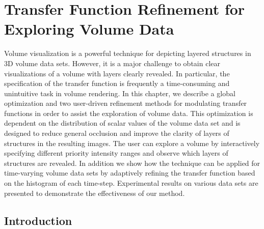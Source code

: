 \chapter{Transfer Function Refinement for Exploring Volume Data}
Volume visualization is a powerful technique for depicting layered structures in 3D volume data sets. However, it is a major challenge to obtain clear visualizations of a volume with layers clearly revealed.
In particular, the specification of the transfer function is frequently a time-consuming and unintuitive task in volume rendering.
In this chapter, we describe a global optimization and two user-driven refinement methods for modulating transfer functions in order to assist the exploration of volume data.
This optimization is dependent on the distribution of scalar values of the volume data set and is designed to reduce general occlusion and improve the clarity of layers of structures in the resulting images.
The user can explore a volume by interactively specifying different priority intensity ranges and observe which layers of structures are revealed. In addition we show how the technique can be applied for time-varying volume data sets by adaptively refining the transfer function based on the histogram of each time-step. 
Experimental results on various data sets are presented to demonstrate the effectiveness of our method.

\section{Introduction}

